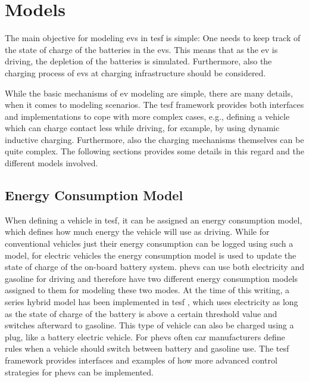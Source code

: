 \section{Models}
The main objective for modeling \glspl{ev} in \gls{tesf} is simple: One needs to keep track of the state of charge of the batteries in the \glspl{ev}. This means that as the \gls{ev} is driving, the depletion of the batteries is simulated. Furthermore, also the charging process of \glspl{ev} at charging infrastructure should be considered.

While the basic mechanisms of \gls{ev} modeling are simple, there are many details, when it comes to modeling scenarios. The \gls{tesf} framework provides both interfaces and implementations to cope with more complex cases, e.g., defining a vehicle which can charge contact less while driving, for example, by using dynamic inductive charging. Furthermore, also the charging mechanisms themselves can be quite complex. The following sections provides some details in this regard and the different models involved.

\subsection{Energy Consumption Model}
When defining a vehicle in \gls{tesf}, it can be assigned an energy consumption model, which defines how much energy the vehicle will use as driving. While for conventional vehicles just their energy consumption can be logged using such a model, for electric vehicles the energy consumption model is used to update the state of charge of the on-board battery system. \glspl{phev} can use both electricity and gasoline for driving and therefore have two different energy consumption models assigned to them for modeling these two modes. At the time of this writing, a series hybrid model has been implemented in \gls{tesf} \citep[][]{Chan_PIEEE_2007}, which uses electricity as long as the state of charge of the battery is above a certain threshold value and switches afterward to gasoline. This type of vehicle can also be charged using a plug, like a battery electric vehicle. For \glspl{phev} often car manufacturers define rules when a vehicle should switch between battery and gasoline use. The \gls{tesf} framework provides interfaces and examples of how more advanced control strategies for \glspl{phev} can be implemented.

